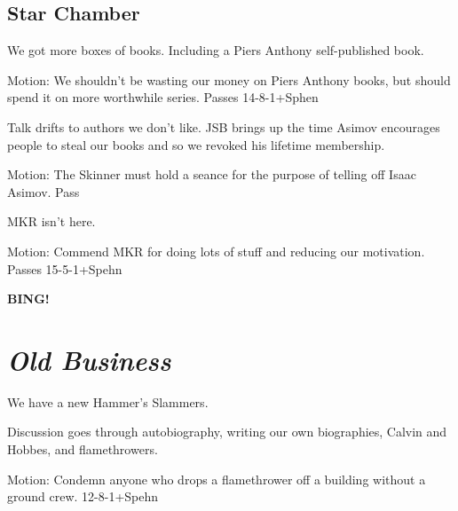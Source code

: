 \documentclass[10pt]{article}
\newcommand{\bing}{{\bf BING!} }
\newcommand{\goto}[1]{\bing \vskip 12pt \section*{{\em{#1}}}}
\begin{document}




\subsection*{Star Chamber}

We got more boxes of books.  Including a Piers Anthony self-published book.  

Motion:  We shouldn't be wasting our money on Piers Anthony books, but should spend it on more worthwhile series.  Passes 14-8-1+Sphen

Talk drifts to authors we don't like.  JSB brings up the time Asimov encourages people to steal our books and so we revoked his lifetime membership.

Motion:  The Skinner must hold a seance for the purpose of telling off Isaac Asimov.  Pass

MKR isn't here.

Motion:  Commend MKR for doing lots of stuff and reducing our motivation.  Passes 15-5-1+Spehn


\goto{Old Business}

We have a new Hammer's Slammers.

Discussion goes through autobiography, writing our own biographies, Calvin and Hobbes, and flamethrowers.

Motion:  Condemn anyone who drops a flamethrower off a building without a ground crew.  12-8-1+Spehn
\end{document}
